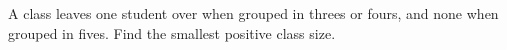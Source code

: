 A class leaves one student over when grouped in threes or fours, and none when grouped in fives. Find the smallest positive class size.
